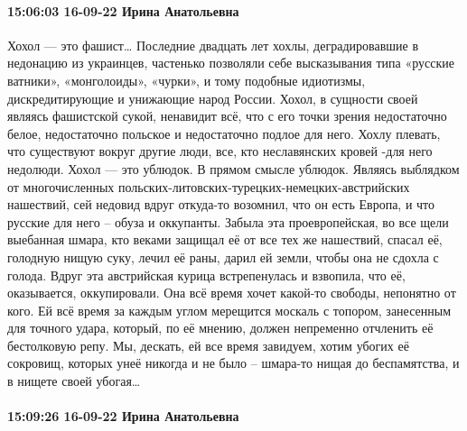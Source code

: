 \paragraph{15:06:03 16-09-22 Ирина Анатольевна}

Хохол — это фашист…
Последние двадцать лет хохлы, деградировавшие в недонацию из украинцев, частенько позволяли себе высказывания типа «русские ватники», «монголоиды», «чурки», и тому подобные идиотизмы, дискредитирующие и унижающие народ России. Хохол, в сущности своей являясь фашистской сукой, ненавидит всё, что с его точки зрения недостаточно белое, недостаточно польское и недостаточно подлое для него. Хохлу плевать, что существуют вокруг другие люди, все, кто неславянских кровей -для него недолюди.
Хохол — это ублюдок.
В прямом смысле ублюдок. Являясь выблядком от многочисленных польских-литовских-турецких-немецких-австрийских нашествий, сей недовид вдруг откуда-то возомнил, что он есть Европа, и что русские для него – обуза и оккупанты. Забыла эта проевропейская, во все щели выебанная шмара, кто веками защищал её от все тех же нашествий, спасал её, голодную нищую суку, лечил её раны, дарил ей земли, чтобы она не сдохла с голода. Вдруг эта австрийская курица встрепенулась и взвопила, что её, оказывается, оккупировали. Она всё время хочет какой-то свободы, непонятно от кого. Ей всё время за каждым углом мерещится москаль с топором, занесенным для точного удара, который, по её мнению, должен непременно отчленить её бестолковую репу. Мы, дескать, ей все время завидуем, хотим убогих её сокровищ, которых унеё никогда и не было – шмара-то нищая до беспамятства, и в нищете своей убогая…

\paragraph{15:09:26 16-09-22 Ирина Анатольевна}

